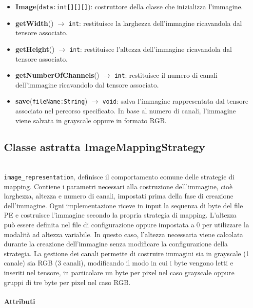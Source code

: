 \begin{itemize}
    \raggedright
    \item \textbf{Image}(\texttt{data:int[][][]}): costruttore della classe
    che inizializza l’immagine.
    \item \textbf{getWidth}() $\rightarrow$ \texttt{int}: restituisce la
    larghezza dell’immagine ricavandola dal tensore associato.
    \item \textbf{getHeight}() $\rightarrow$ \texttt{int}: restituisce
    l’altezza dell’immagine ricavandola dal tensore associato.
    \item \textbf{getNumberOfChannels}() $\rightarrow$ \texttt{int}:
    restituisce il numero di canali dell’immagine ricavandolo dal tensore
    associato.
    \item \textbf{save}(\texttt{fileName:String}) $\rightarrow$
    \texttt{void}: salva l’immagine rappresentata dal tensore associato
    nel percorso specificato. In base al numero
    di canali, l’immagine viene salvata in grayscale oppure in formato RGB.
\end{itemize}

\subsection{Classe astratta ImageMappingStrategy}

\noindent{}\\
\texttt{image\_representation}, definisce il comportamento comune delle
strategie di mapping. Contiene i parametri necessari alla costruzione
dell’immagine, cioè larghezza, altezza e numero di canali, impostati prima
della fase di creazione dell’immagine. Ogni implementazione riceve in input
la sequenza di byte del file PE e costruisce l’immagine secondo la propria
strategia di mapping.
L’altezza può essere definita nel file di configurazione oppure impostata a
0 per utilizzare la modalità ad altezza variabile. In questo caso, l’altezza
necessaria viene calcolata durante la creazione dell’immagine senza
modificare la configurazione della strategia.
La gestione dei canali permette di costruire immagini sia in grayscale
(1 canale) sia RGB (3 canali), modificando il modo in cui i byte vengono
letti e inseriti nel tensore, in particolare un byte per pixel nel caso
grayscale oppure gruppi di tre byte per pixel nel caso RGB.

\paragraph{Attributi}

